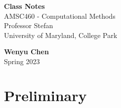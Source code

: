 \documentclass[11pt,oneside]{book}
\theoremstyle{break}
\theoremstyle{break}
\begin{document}
	\begin{titlepage}
		\begin{center}
			\vspace*{\fill}
			\Huge \color{red}
				\textbf{Class Notes}\\
				\color{black}
			\vspace{0.5cm}			
			\Large 
				AMSC460 - Computational Methods \\
				Professor Stefan\\
				University of Maryland, College Park
			\vspace{3cm}

			
			
			\vspace{5cm}
			\LARGE
				\textbf{Wenyu Chen}\\
				\hfill\break
				\LARGE Spring 2023\\
				\color{black}
			\vspace{5cm}

		\vspace*{\fill}
		\author{Wenyu Chen} \date{Summer 2022}
		\end{center}			
	\end{titlepage}
	\newpage
	\tableofcontents
	\newpage
	\chapter[Preliminary]{Preliminary}
\end{document}
